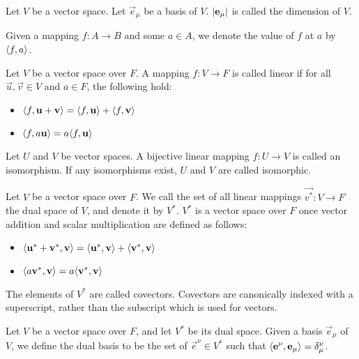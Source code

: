 \documentclass[../main.tex]{subfiles}
\begin{document}
    \begin{definition}[Dimension]
        Let \(V\) be a vector space. Let \(\vec{e}_{\mu}\) be a basis of \(V\). \(\lvert\mathbf{e}_{\mu}\rvert\) is called the dimension of \(V\).
    \end{definition}
    \begin{notation}[Mappings]
        Given a mapping \(f:A\to{}B\) and some \(a\in{}A\), we denote the value of \(f\) at \(a\) by \(\langle f,a\rangle\).
    \end{notation}
    \begin{definition}
        Let \(V\) be a vector space over \(F\). A mapping \(f:V\to{}F\) is called linear if for all \(\vec{u},\vec{v}\in{}V\) and \(a\in{}F\), the following hold:
        \begin{itemize}
            \item\(\langle f,\mathbf{u}+\mathbf{v}\rangle=\langle f,\mathbf{u}\rangle+\langle f,\mathbf{v}\rangle\)
            \item\(\langle f,a\mathbf{u}\rangle=a\langle f,\mathbf{u}\rangle\)
        \end{itemize}
    \end{definition}
    \begin{definition}[Isomorphism]
        Let \(U\) and \(V\) be vector spaces. A bijective linear mapping \(f:U\to{}V\) is called an isomorphism. If any isomorphisms exist, \(U\) and \(V\) are called isomorphic.
    \end{definition}
    \begin{definition}
        Let \(V\) be a vector space over \(F\). We call the set of all linear mappings \(\vec{v^{*}}:V\to{}F\) the dual space of \(V\), and denote it by \(V^{*}\). \(V^{*}\) is a vector space over \(F\) once vector addition and scalar multiplication are defined as follows:
        \begin{itemize}
            \item\(\langle\mathbf{u}^{*}+\mathbf{v}^{*},\mathbf{v}\rangle=\langle\mathbf{u}^{*},\mathbf{v}\rangle+\langle\mathbf{v}^{*},\mathbf{v}\rangle\)
            \item\(\langle a\mathbf{v}^{*},\mathbf{v}\rangle=a\langle\mathbf{v}^{*},\mathbf{v}\rangle\)
        \end{itemize}
        The elements of \(V^{*}\) are called covectors. Covectors are canonically indexed with a superscript, rather than the subscript which is used for vectors.
    \end{definition}
    \begin{definition}
        Let \(V\) be a vector space over \(F\), and let \(V^{*}\) be its dual space. Given a basis \(\vec{e}_{\mu}\) of \(V\), we define the dual basis to be the set of \(\vec{e}^{\nu}\in{}V^{*}\) such that \(\langle\mathbf{e}^{\nu},\mathbf{e}_{\mu}\rangle=\delta^{\nu}_{\mu}\).
    \end{definition}
\end{document}
